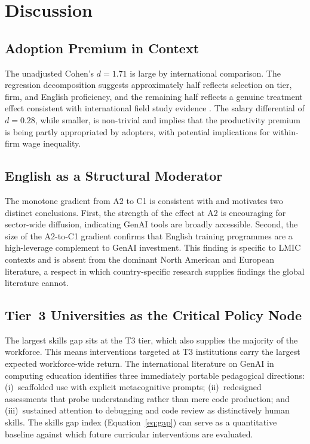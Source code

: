 \documentclass[11pt,a4paper]{article}
\begin{document}
\section{Discussion}

\subsection{Adoption Premium in Context}

The unadjusted Cohen's $d=1.71$ is large by international comparison.
The regression decomposition suggests approximately half reflects
selection on tier, firm, and English proficiency, and the remaining
half reflects a genuine treatment effect consistent with international
field study evidence
\citep{PengKalliamvakouEtAl2023,ZieglerEtAl2024,CuiDemirerEtAl2025}.
The salary differential of $d=0.28$, while smaller, is non-trivial
and implies that the productivity premium is being partly
appropriated by adopters, with potential implications for within-firm
wage inequality.

\subsection{English as a Structural Moderator}

The monotone gradient from A2 to C1 is consistent with
\citet{NurFarhanaTalukder2024} and motivates two distinct conclusions.
First, the strength of the effect at A2 is encouraging for sector-wide
diffusion, indicating GenAI tools are broadly accessible. Second,
the size of the A2-to-C1 gradient confirms that English training
programmes are a high-leverage complement to GenAI investment. This
finding is specific to LMIC contexts and is absent from the dominant
North American and European literature, a respect in which
country-specific research supplies findings the global literature
cannot.

\subsection{Tier~3 Universities as the Critical Policy Node}

The largest skills gap sits at the T3 tier, which also supplies the
majority of the workforce. This means interventions targeted at T3
institutions carry the largest expected workforce-wide return. The
international literature on GenAI in computing education
\citep{BeckerDennyPratherEtAl2023,PratherEtAl2024,DennyEtAl2024,Vadaparty2025}
identifies three immediately portable pedagogical directions:
(i)~scaffolded use with explicit metacognitive prompts;
(ii)~redesigned assessments that probe understanding rather than
mere code production; and (iii)~sustained attention to debugging
and code review as distinctively human skills. The skills gap index
(Equation~\ref{eq:gap}) can serve as a quantitative baseline against
which future curricular interventions are evaluated.
\end{document}
